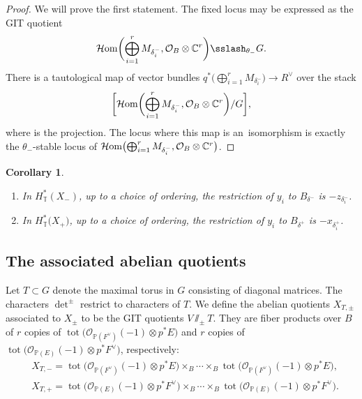 \documentclass[pdftex]{sigma}
\newtheorem{Corollary}[Theorem]{Corollary}
\numberwithin{equation}{section}
\newcommand{\cc}[1]{\mathcal{#1}} %
\newcommand{\CC}{\mathbb{C}}
\newcommand{\PP}{\mathbb{P}}
\newcommand{\torus}{\mathbb{T}}
\DeclareMathOperator{\tot}{tot}
\newcommand{\F}{F}
\newcommand{\E}{E}
\newcommand{\MB}{M}
\newcommand{\z}{z}
\newcommand{\x}{x}
\newcommand{\y}{y}
\begin{document}
\begin{proof}
We will prove the first statement. The fixed locus may be expressed as the GIT quotient
\[
\mathcal{H}{\rm om}\biggl(\bigoplus_{i=1}^r \MB_{\delta^-_i}, \cc O_B \otimes \CC^r\biggr) \sslash_{\theta_{-}} G.
\]
There is a tautological map of vector bundles
$q^*\bigl(\bigoplus_{i=1}^r \MB_{\delta^-_i}\bigr) \to R^\vee$
over the stack
\[
\biggl[\mathcal{H}{\rm om}\biggl(\bigoplus_{i=1}^r \MB_{\delta^-_i}, \cc O_B \otimes \CC^r\biggr) / G\biggr],
\]
where \smash{$q\colon \bigl[\mathcal{H}{\rm om}\bigl(\bigoplus_{i=1}^r \MB_{\delta^-_i}, \cc O_B \otimes \CC^r\bigr) / G\bigr] \to B$} is the projection.
The locus where this map is an~isomorphism is exactly the $\theta_{-}$-stable locus of $\mathcal{H}{\rm om}\bigl( \bigoplus_{i=1}^r \MB_{\delta^-_i}, \cc O_B \otimes \CC^r\bigr)$.
\end{proof}

\begin{Corollary}\label{c:rest}\quad
\begin{enumerate}\itemsep=0pt
\item[$1.$] In $H^*_\torus(X_-)$, up to a choice of ordering, the restriction of $\y_i$ to $B_{\delta^{-}}$ is $-\z_{\delta^{-}_i}$.
\item[$2.$] In $H^*_\torus\bigl(X_+\bigr)$, up to a choice of ordering, the restriction of $\y_i$ to $B_{\delta^{+}}$ is $-\x_{\delta^{+}_i}$.
\end{enumerate}
\end{Corollary}

\subsection{The associated abelian quotients}\label{s:aa}
Let $T \subset G$ denote the maximal torus in $G$ consisting of diagonal matrices. The characters $\det^\pm$ restrict to characters of $T$. We define the abelian quotients $X_{T, \pm}$ associated to $X_\pm$ to be the GIT quotients $V \sslash_\pm T$. They are fiber products over $B$ of $r$ copies of $\tot\bigl(\cc O_{\PP(\F^\vee)}(-1) \otimes p^*\E\bigr)$ and $r$ copies of $\tot\bigl(\cc O_{\PP(\E)}(-1) \otimes p^*\F^\vee\bigr)$, respectively:
\begin{align*}
&X_{T, {-}}= \tot \bigl( \cc O_{\PP(\F^\vee)}(-1) \otimes p^*\E\bigr) \times_B \cdots \times_B \tot \bigl( \cc O_{\PP(\F^\vee)}(-1) \otimes p^*\E\bigr),\\
&X_{T, {+}}= \tot \bigl( \cc O_{\PP(\E)}(-1) \otimes p^*\F^\vee\bigr) \times_B \cdots \times_B \tot \bigl( \cc O_{\PP(\E)}(-1) \otimes p^*\F^\vee\bigr).
\end{align*}
\end{document}
